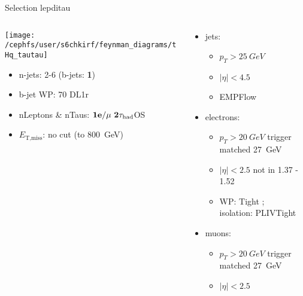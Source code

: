 \begin{frame}{Selection lepditau}
  \begin{columns}
    \begin{column}{0.5\textwidth}
      \centering \texttt{[image: /cephfs/user/s6chkirf/feynman\_diagrams/tHq\_tautau]}\\
      \begin{itemize}
        \item n-jets: 2-6 (b-jets: \textbf{1})
        \item b-jet WP: 70 DL1r
        \item nLeptons \& nTaus: $\bf{1e / \mu~2\tau_{\text{had}}} $OS
        \item $E_{\text{T,miss}}$: no cut (to \SI{800}{GeV})
      \end{itemize}
    \end{column}
    \begin{column}{0.7\textwidth}
      \vspace*{-0.05\textwidth}
      \begin{itemize}
        \footnotesize
        \item jets:
        \vspace*{-0.02\textwidth}
        \begin{itemize}
          \footnotesize
          \item $p_T>\SI{25}{GeV}$
          \item $|\eta|<4.5$
          \item EMPFlow
        \end{itemize}
        \item electrons:
        \vspace*{-0.02\textwidth}
        \begin{itemize}
          \footnotesize
          \item $p_T>\SI{20}{GeV}$ trigger matched \SI{27}{GeV}
          \item $|\eta|<2.5$ not in 1.37 - 1.52
          \item WP: Tight ; \\isolation: PLIVTight
        \end{itemize}
        \item muons:
        \vspace*{-0.02\textwidth}
        \begin{itemize}
          \footnotesize
          \item $p_T>\SI{20}{GeV}$ trigger matched \SI{27}{GeV}
          \item $|\eta|<2.5$

\end{itemize}
\end{itemize}
\end{column}
\end{columns}
\end{frame}
